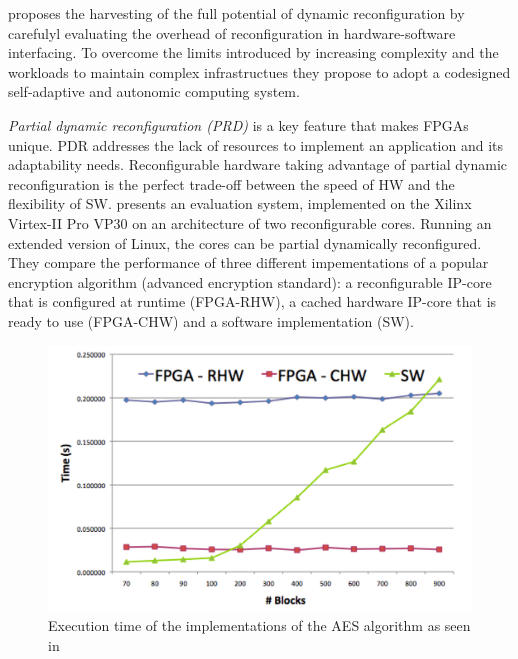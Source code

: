 \cite{reconfigurable} proposes the harvesting of the full potential of dynamic reconfiguration by carefulyl evaluating the overhead of reconfiguration in hardware-software interfacing. To overcome the limits introduced by increasing complexity and the workloads to maintain complex infrastructues they propose to adopt a codesigned self-adaptive and autonomic computing system. 

\emph{Partial dynamic reconfiguration (PRD)} is a key feature that makes FPGAs unique. PDR addresses the lack of resources to implement an application and its adaptability needs. Reconfigurable hardware taking advantage of partial dynamic reconfiguration is the perfect trade-off between the speed of HW and the flexibility of SW. \cite{reconfigurable} presents an evaluation system, implemented on the Xilinx Virtex-II Pro VP30 on an architecture of two reconfigurable cores. Running an extended version of Linux, the cores can be partial dynamically reconfigured. They compare the performance of three different impementations of a popular encryption algorithm (advanced encryption standard): a reconfigurable IP-core that is configured at runtime (FPGA-RHW), a cached hardware IP-core that is ready to use (FPGA-CHW) and a software implementation (SW). 
\begin{figure}[htb]%
\includegraphics[width=\columnwidth]{Pictures/reconfig.png}%
\caption{Execution time of the implementations of the AES algorithm as seen in \cite{reconfigurable}}%
\label{fig:reconfig}%
\end{figure} 
